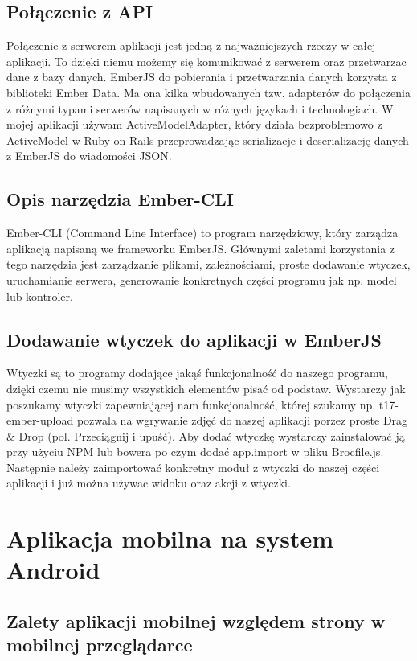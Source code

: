 \documentclass[brudnopis]{xmgr}
\begin{document}
\subsection{Połączenie z API}
Połączenie z serwerem aplikacji jest jedną z najważniejszych rzeczy w całej aplikacji. To dzięki niemu możemy się komunikować z serwerem oraz przetwarzac dane z bazy danych. EmberJS do pobierania i przetwarzania danych korzysta z biblioteki Ember Data. Ma ona kilka wbudowanych tzw. adapterów do połączenia z różnymi typami serwerów napisanych w różnych językach i technologiach. W mojej aplikacji używam ActiveModelAdapter, który działa bezproblemowo z ActiveModel w Ruby on Rails przeprowadzając serializacje i deserializację danych z EmberJS do wiadomości JSON.

\subsection{Opis narzędzia Ember-CLI}
Ember-CLI (Command Line Interface) to program narzędziowy, który zarządza aplikacją napisaną we frameworku EmberJS. Głównymi zaletami korzystania z tego narzędzia jest zarządzanie plikami, zależnościami, proste dodawanie wtyczek, uruchamianie serwera, generowanie konkretnych części programu jak np. model lub kontroler.

\subsection{Dodawanie wtyczek do aplikacji w EmberJS}
Wtyczki są to programy dodające jakąś funkcjonalność do naszego programu, dzięki czemu nie musimy wszystkich elementów pisać od podstaw. Wystarczy jak poszukamy wtyczki zapewniającej nam funkcjonalność, której szukamy np. t17-ember-upload pozwala na wgrywanie zdjęć do naszej aplikacji porzez proste Drag \& Drop (pol. Przeciągnij i upuść).  Aby dodać wtyczkę wystarczy zainstalować ją przy użyciu NPM lub bowera  po czym dodać app.import w pliku Brocfile.js. Następnie należy zaimportować konkretny moduł z wtyczki do naszej części aplikacji i już można używac widoku oraz akcji z wtyczki.

\section{Aplikacja mobilna  na system Android}
\subsection{Zalety aplikacji mobilnej względem strony w mobilnej przeglądarce}
\end{document}
